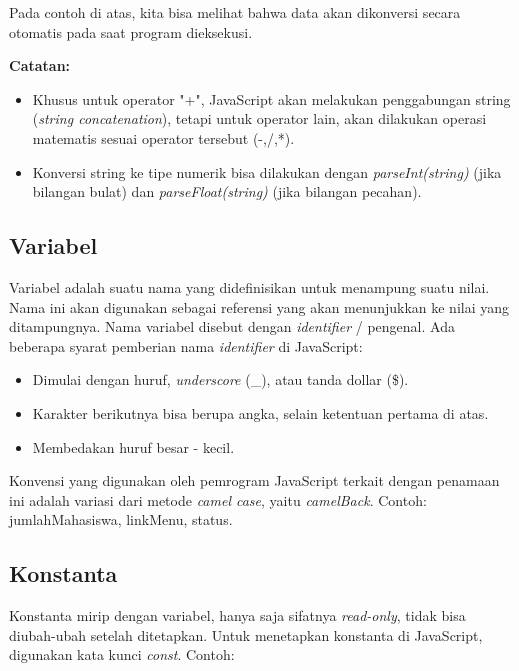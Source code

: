 Pada contoh di atas, kita bisa melihat bahwa data akan dikonversi secara otomatis pada saat program dieksekusi.

\begin{Sbox}
\begin{minipage}{\textwidth}
\textbf{Catatan:}
\begin{itemize}
  \item Khusus untuk operator "+", JavaScript akan melakukan penggabungan string (\textit{string concatenation}), tetapi untuk operator lain, akan dilakukan operasi matematis sesuai operator tersebut (-,/,*).
  \item Konversi string ke tipe numerik bisa dilakukan dengan \textit{parseInt(string)} (jika bilangan bulat) dan \textit{parseFloat(string)} (jika bilangan pecahan).
\end{itemize}
\end{minipage}
\end{Sbox}
\begin{center}
\shadowbox{\TheSbox}
\end{center}

\subsection{Variabel}

Variabel adalah suatu nama yang didefinisikan untuk menampung suatu nilai. Nama ini akan digunakan sebagai referensi yang akan menunjukkan ke nilai yang ditampungnya. Nama variabel disebut dengan \textit{identifier} / pengenal. Ada beberapa syarat pemberian nama \textit{identifier} di JavaScript: 
\begin{itemize}
  \item Dimulai dengan huruf, \textit{underscore} (\_), atau tanda dollar (\$).
  \item Karakter berikutnya bisa berupa angka, selain ketentuan pertama di atas.
  \item Membedakan huruf besar - kecil.
\end{itemize}
Konvensi yang digunakan oleh pemrogram JavaScript terkait dengan penamaan ini adalah variasi dari metode \textit{camel case}, yaitu \textit{camelBack}. Contoh: jumlahMahasiswa, linkMenu, status.

\subsection{Konstanta}

Konstanta mirip dengan variabel, hanya saja sifatnya \textit{read-only}, tidak bisa diubah-ubah setelah ditetapkan. Untuk menetapkan konstanta di JavaScript, digunakan kata kunci \textit{const}. Contoh: 

